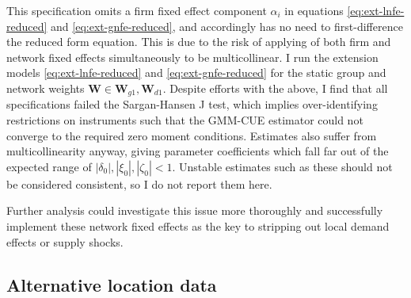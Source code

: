This specification omits a firm fixed effect component $\alpha_i$ in equations
\eqref{eq:ext-lnfe-reduced} and \eqref{eq:ext-gnfe-reduced},
and accordingly has no need to first-difference the reduced form equation.
This is due to the risk of applying of both firm and network fixed effects
simultaneously to be multicollinear.
I run the extension models
\eqref{eq:ext-lnfe-reduced} and \eqref{eq:ext-gnfe-reduced}
for the static group and network weights $\mathbf W\in \mathbf W_{g1}, \mathbf W_{d1}$.
Despite efforts with the above, I find that all specifications failed the Sargan-Hansen J test,
which implies over-identifying restrictions on instruments
such that the GMM-CUE estimator could not converge to the required zero moment conditions.
Estimates also suffer from multicollinearity anyway, giving parameter coefficients
which fall far out of the expected range of $|\delta_0|, |\xi_0|, |\zeta_0|<1$.
Unstable estimates such as these should not be considered consistent,
so I do not report them here.
\par
Further analysis could investigate this issue more thoroughly
and successfully implement these network fixed effects as the key to stripping out
local demand effects or supply shocks.

\subsection{Alternative location data}
\label{ss:ext-alt-location}

